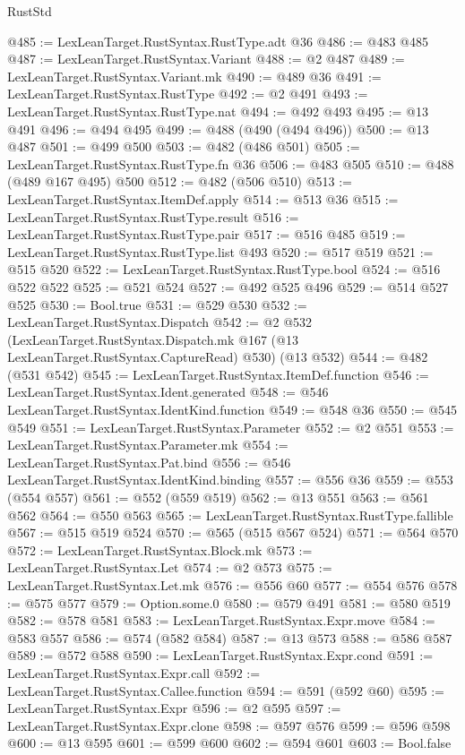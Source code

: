 \begin{lexlean}{RustStd}
\begin{coremodule}
@485 := LexLeanTarget.RustSyntax.RustType.adt @36
@486 := @483 @485
@487 := LexLeanTarget.RustSyntax.Variant
@488 := @2 @487
@489 := LexLeanTarget.RustSyntax.Variant.mk
@490 := @489 @36
@491 := LexLeanTarget.RustSyntax.RustType
@492 := @2 @491
@493 := LexLeanTarget.RustSyntax.RustType.nat
@494 := @492 @493
@495 := @13 @491
@496 := @494 @495
@499 := @488 (@490 (@494 @496))
@500 := @13 @487
@501 := @499 @500
@503 := @482 (@486 @501)
@505 := LexLeanTarget.RustSyntax.RustType.fn @36
@506 := @483 @505
@510 := @488 (@489 @167 @495) @500
@512 := @482 (@506 @510)
@513 := LexLeanTarget.RustSyntax.ItemDef.apply
@514 := @513 @36
@515 := LexLeanTarget.RustSyntax.RustType.result
@516 := LexLeanTarget.RustSyntax.RustType.pair
@517 := @516 @485
@519 := LexLeanTarget.RustSyntax.RustType.list @493
@520 := @517 @519
@521 := @515 @520
@522 := LexLeanTarget.RustSyntax.RustType.bool
@524 := @516 @522 @522
@525 := @521 @524
@527 := @492 @525 @496
@529 := @514 @527 @525
@530 := Bool.true
@531 := @529 @530
@532 := LexLeanTarget.RustSyntax.Dispatch
@542 := @2
    @532
    (LexLeanTarget.RustSyntax.Dispatch.mk @167 (@13 LexLeanTarget.RustSyntax.CaptureRead) @530)
    (@13 @532)
@544 := @482 (@531 @542)
@545 := LexLeanTarget.RustSyntax.ItemDef.function
@546 := LexLeanTarget.RustSyntax.Ident.generated
@548 := @546 LexLeanTarget.RustSyntax.IdentKind.function
@549 := @548 @36
@550 := @545 @549
@551 := LexLeanTarget.RustSyntax.Parameter
@552 := @2 @551
@553 := LexLeanTarget.RustSyntax.Parameter.mk
@554 := LexLeanTarget.RustSyntax.Pat.bind
@556 := @546 LexLeanTarget.RustSyntax.IdentKind.binding
@557 := @556 @36
@559 := @553 (@554 @557)
@561 := @552 (@559 @519)
@562 := @13 @551
@563 := @561 @562
@564 := @550 @563
@565 := LexLeanTarget.RustSyntax.RustType.fallible
@567 := @515 @519 @524
@570 := @565 (@515 @567 @524)
@571 := @564 @570
@572 := LexLeanTarget.RustSyntax.Block.mk
@573 := LexLeanTarget.RustSyntax.Let
@574 := @2 @573
@575 := LexLeanTarget.RustSyntax.Let.mk
@576 := @556 @60
@577 := @554 @576
@578 := @575 @577
@579 := Option.some.{0}
@580 := @579 @491
@581 := @580 @519
@582 := @578 @581
@583 := LexLeanTarget.RustSyntax.Expr.move
@584 := @583 @557
@586 := @574 (@582 @584)
@587 := @13 @573
@588 := @586 @587
@589 := @572 @588
@590 := LexLeanTarget.RustSyntax.Expr.cond
@591 := LexLeanTarget.RustSyntax.Expr.call
@592 := LexLeanTarget.RustSyntax.Callee.function
@594 := @591 (@592 @60)
@595 := LexLeanTarget.RustSyntax.Expr
@596 := @2 @595
@597 := LexLeanTarget.RustSyntax.Expr.clone
@598 := @597 @576
@599 := @596 @598
@600 := @13 @595
@601 := @599 @600
@602 := @594 @601
@603 := Bool.false

\end{coremodule}
\end{lexlean}
